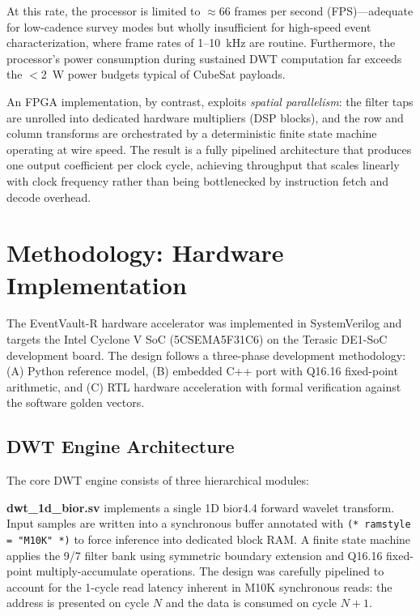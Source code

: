 \documentclass[conference]{IEEEtran}
\begin{document}
At this rate, the processor is limited to $\approx$66 frames per second (FPS)---adequate for low-cadence survey modes but wholly insufficient for high-speed event characterization, where frame rates of 1--10~kHz are routine. Furthermore, the processor's power consumption during sustained DWT computation far exceeds the $<$2~W power budgets typical of CubeSat payloads.

An FPGA implementation, by contrast, exploits \textit{spatial parallelism}: the filter taps are unrolled into dedicated hardware multipliers (DSP blocks), and the row and column transforms are orchestrated by a deterministic finite state machine operating at wire speed. The result is a fully pipelined architecture that produces one output coefficient per clock cycle, achieving throughput that scales linearly with clock frequency rather than being bottlenecked by instruction fetch and decode overhead.

\section{Methodology: Hardware Implementation}

The EventVault-R hardware accelerator was implemented in SystemVerilog and targets the Intel Cyclone V SoC (5CSEMA5F31C6) on the Terasic DE1-SoC development board. The design follows a three-phase development methodology: (A) Python reference model, (B) embedded C++ port with Q16.16 fixed-point arithmetic, and (C) RTL hardware acceleration with formal verification against the software golden vectors.

\subsection{DWT Engine Architecture}

The core DWT engine consists of three hierarchical modules:

\textbf{dwt\_1d\_bior.sv} implements a single 1D bior4.4 forward wavelet transform. Input samples are written into a synchronous buffer annotated with \texttt{(* ramstyle = "M10K" *)} to force inference into dedicated block RAM. A finite state machine applies the 9/7 filter bank using symmetric boundary extension and Q16.16 fixed-point multiply-accumulate operations. The design was carefully pipelined to account for the 1-cycle read latency inherent in M10K synchronous reads: the address is presented on cycle $N$ and the data is consumed on cycle $N+1$.
\end{document}
